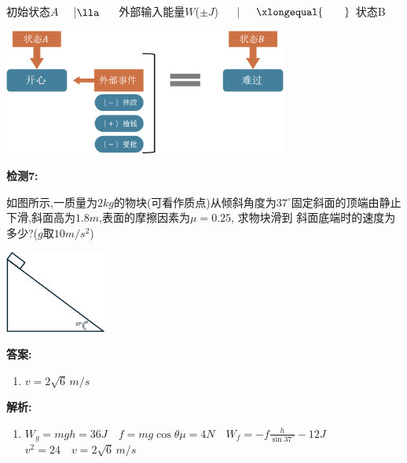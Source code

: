 \documentclass{article}
\begin{document}
\begin{itemize}
\begin{enumerate}
\begin{enumerate}
                            初始状态$A\quad$ |$\lla$ $\quad$ 外部输入能量$W$($\pm J$) $\quad$ | $\quad \xlongequal{\quad\quad}$ 状态B

                            \vspace{2em}

                            \includegraphics[width=0.7\textwidth]{pictures/4.png}

                            \vspace{2em}

                            \textbf{检测7:}

                            如图所示,一质量为$2kg$的物块(可看作质点)从倾斜角度为$37^{\circ}$固定斜面的顶端由静止下滑,斜面高为$1.8m$,表面的摩擦因素为$\mu = 0.25$,
                            求物块滑到
                            斜面底端时的速度为多少?($g$取$10m/s^{2}$)

                            \vspace{1em}

                            \includegraphics[width=0.25\textwidth]{pictures/5.png}

                            \vspace{1.5em}

                            \textbf{答案:}
                            \begin{enumerate}[label=(\arabic*)]
                                \item[] $v = 2\sqrt{6} \, m/s $
                            \end{enumerate}

                            \textbf{解析:}
                            \begin{enumerate}[label=(\arabic*)]
                                \item[] $W_{g} = mgh = 36J \quad f = mg\cos{\theta}\mu = 4N \quad W_{f} = - f \frac{h}{\sin{37^\circ}} - 12J $ \\
                                    $v^{2} = 24 \quad v = 2\sqrt{6} \, m/s$
                            \end{enumerate}

                  \end{enumerate}

          \end{enumerate}
\end{itemize}
\end{document}
